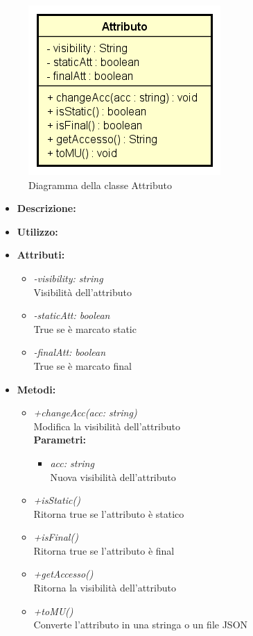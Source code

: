 \begin{figure}[h!]
	\centering
	\includegraphics[scale=0.8]{res/sections/SpecificaFrontEnd/Services/Disegnetti/attributo.png}
	\caption{Diagramma della classe Attributo}
\end{figure}

\begin{itemize}
	\item \textbf{Descrizione:}\\
	
	\item \textbf{Utilizzo:}\\
	
	\item \textbf{Attributi:}
		\begin{itemize}
			\item \emph{-visibility: string}\\
			Visibilità dell'attributo
			\item \emph{-staticAtt: boolean}\\
			True se è marcato static
			\item \emph{-finalAtt: boolean}\\
			True se è marcato final
		\end{itemize}
	\item \textbf{Metodi:}
		\begin{itemize}
			\item \emph{+changeAcc(acc: string)}\\
    		Modifica la visibilità dell'attributo\\
    		\textbf{Parametri:}
    		\begin{itemize}
    			\item \emph{acc: string}\\
    			Nuova visibilità dell'attributo
    		\end{itemize}
    		\item \emph{+isStatic()}\\
    		Ritorna true se l'attributo è statico
    		\item \emph{+isFinal()}\\
    		Ritorna true se l'attributo è final
    		\item \emph{+getAccesso()}\\
    		Ritorna la visibilità dell'attributo
    		\item \emph{+toMU()}\\
    		Converte l'attributo in una stringa o un file JSON
    	\end{itemize}
\end{itemize}